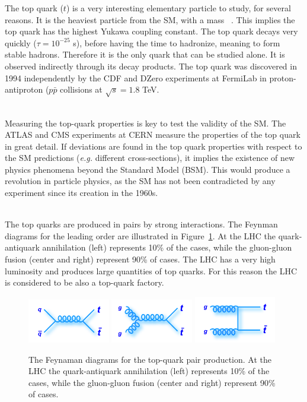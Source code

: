 The top quark ($t$) is a very interesting elementary particle to study, for several reasons. It is the heaviest particle from the SM, with a mass ~\GeVcc. This implies the top quark has the highest Yukawa coupling constant. The top quark decays very quickly ($\tau=10^{-25}$ s), before having the time to hadronize, meaning to form stable hadrons. Therefore it is the only quark that can be studied alone. It is observed indirectly through its decay products. The top quark was discovered in 1994 independently by the CDF and DZero experiments at FermiLab in proton-antiproton ($p\bar{p}$ collisions at $\sqrt{s}=1.8$ TeV.

\ \\Measuring the top-quark properties is key to test the validity of the SM. The ATLAS and CMS experiments at CERN measure the properties of the top quark in great detail. If deviations are found in the top quark properties with respect to the SM predictions (\emph{e.g.} different cross-sections), it implies the existence of new physics phenomena beyond the Standard Model (BSM). This would produce a revolution in particle physics, as the SM has not been contradicted by any experiment since its creation in the 1960s. 

\ \\The top quarks are produced in pairs by strong interactions. The Feynman diagrams for the leading order are illustrated in Figure~\ref{fig:TopQuarkFeynmanDiagrams}. At the LHC the quark-antiquark annihilation (left) represents 10\% of the cases, while the gluon-gluon fusion (center and right) represent 90\% of cases. The LHC has a very high luminosity and produces large quantities of top quarks. For this reason the LHC is considered to be also a top-quark factory.

\begin{figure}[h]
  \centering
  \includegraphics[width=0.32\textwidth]{../presentation/plots/ttbar_1.png}
  \includegraphics[width=0.32\textwidth]{../presentation/plots/ttbar_2.png}
  \includegraphics[width=0.32\textwidth]{../presentation/plots/ttbar_3.png}
  \caption{The Feynaman diagrams for the top-quark pair production. At the LHC the quark-antiquark annihilation (left) represents 10\% of the cases, while the gluon-gluon fusion (center and right) represent 90\% of cases.}
  \label{fig:TopQuarkFeynmanDiagrams}
\end{figure}

